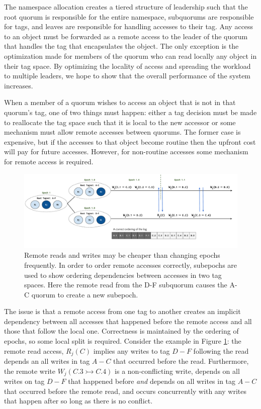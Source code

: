 \documentclass{article}
\begin{document}
The namespace allocation creates a tiered structure of leadership such that the root quorum is responsible for the entire namespace, subquorums are responsible for tags, and leaves are responsible for handling accesses to their tag. Any access to an object must be forwarded as a remote access to the leader of the quorum that handles the tag that encapsulates the object. The only exception is the optimization made for members of the quorum who can read locally any object in their tag space. By optimizing the locality of access and spreading the workload to multiple leaders, we hope to show that the overall performance of the system increases.

When a member of a quorum wishes to access an object that is not in that quorum's tag, one of two things must happen: either a tag decision must be made to reallocate the tag space such that it is local to the new accessor or some mechanism must allow remote accesses between quorums. The former case is expensive, but if the accesses to that object become routine then the upfront cost will pay for future accesses. However, for non-routine accesses some mechanism for remote access is required.

\begin{figure}
    \centering
        \includegraphics[width=.9\textwidth]{figures/subepoch}
        \caption[Subepochs allow remote accesses between tags without a tagspace change.]{Remote reads and writes may be cheaper than changing epochs frequently. In order to order remote accesses correctly, subepochs are used to show ordering dependencies between accesses in two tag spaces. Here the remote read from the D-F subquorum causes the A-C quorum to create a new subepoch.}
        \label{fig:subepoch}
\end{figure}

The issue is that a remote access from one tag to another creates an implicit dependency between all accesses that happened before the remote access and all those that follow the local one. Correctness is maintained by the ordering of epochs, so some local split is required. Consider the example in Figure \ref{fig:subepoch}: the remote read access, $R_j(C)$ implies any writes to tag $D-F$ following the read depends an all writes in tag $A-C$ that occurred before the read. Furthermore, the remote write $W_j(C.3 \rightarrowtail C.4)$ is a non-conflicting write, depends on all writes on tag $D-F$ that happened before \textit{and} depends on all writes in tag $A-C$ that occurred before the remote read, and occurs concurrently with any writes that happen after so long as there is no conflict.
\end{document}

